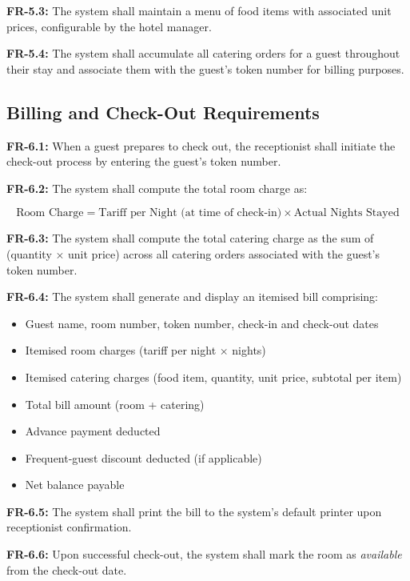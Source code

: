 \documentclass[12pt,a4paper]{article}
\newcommand{\req}[2]{%
  \noindent\textbf{\color{medblue}#1:} #2\par\smallskip
}
\begin{document}
\req{FR-5.3}{The system shall maintain a menu of food items with associated unit prices,
configurable by the hotel manager.}

\req{FR-5.4}{The system shall accumulate all catering orders for a guest throughout their
stay and associate them with the guest's token number for billing purposes.}

\subsection{Billing and Check-Out Requirements}

\req{FR-6.1}{When a guest prepares to check out, the receptionist shall initiate the
check-out process by entering the guest's token number.}

\req{FR-6.2}{The system shall compute the total room charge as:}
\[
  \text{Room Charge} = \text{Tariff per Night (at time of check-in)} \times \text{Actual Nights Stayed}
\]

\req{FR-6.3}{The system shall compute the total catering charge as the sum of
(quantity $\times$ unit price) across all catering orders associated with the guest's
token number.}

\req{FR-6.4}{The system shall generate and display an itemised bill comprising:}
\begin{itemize}[leftmargin=1.5em]
  \item Guest name, room number, token number, check-in and check-out dates
  \item Itemised room charges (tariff per night $\times$ nights)
  \item Itemised catering charges (food item, quantity, unit price, subtotal per item)
  \item Total bill amount (room + catering)
  \item Advance payment deducted
  \item Frequent-guest discount deducted (if applicable)
  \item Net balance payable
\end{itemize}

\req{FR-6.5}{The system shall print the bill to the system's default printer upon
receptionist confirmation.}

\req{FR-6.6}{Upon successful check-out, the system shall mark the room as
\textit{available} from the check-out date.}

\end{document}
